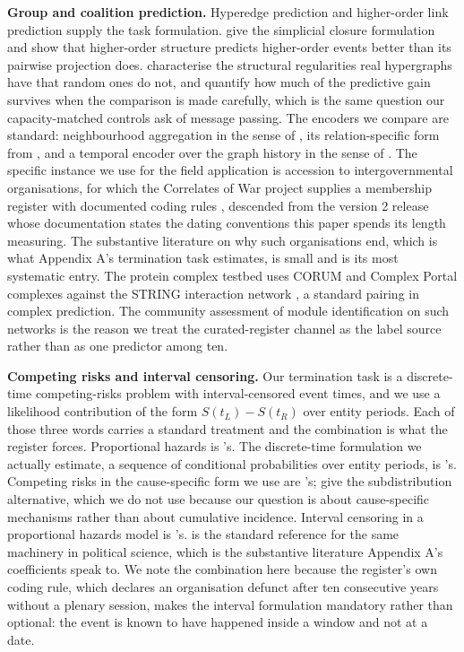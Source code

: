 \documentclass[twoside,11pt]{article}
\begin{document}
\textbf{Group and coalition prediction.} Hyperedge prediction and higher-order link prediction supply the task formulation. \citet{benson} give the simplicial closure formulation and show that higher-order structure predicts higher-order events better than its pairwise projection does. \citet{do_hyper} characterise the structural regularities real hypergraphs have that random ones do not, and \citet{yoon} quantify how much of the predictive gain survives when the comparison is made carefully, which is the same question our capacity-matched controls ask of message passing. The encoders we compare are standard: neighbourhood aggregation in the sense of \citet{hamilton}, its relation-specific form from \citet{rgcn}, and a temporal encoder over the graph history in the sense of \citet{tgn}. The specific instance we use for the field application is accession to intergovernmental organisations, for which the Correlates of War project supplies a membership register with documented coding rules \citep{cow_igo}, descended from the version 2 release \citep{cow_igo2} whose documentation states the dating conventions this paper spends its length measuring. The substantive literature on why such organisations end, which is what Appendix A's termination task estimates, is small and \citet{eilstrup} is its most systematic entry. The protein complex testbed uses CORUM \citep{corum} and Complex Portal \citep{complexportal} complexes against the STRING interaction network \citep{string}, a standard pairing in complex prediction. The community assessment of module identification on such networks \citep{choobdar} is the reason we treat the curated-register channel as the label source rather than as one predictor among ten.

\textbf{Competing risks and interval censoring.} Our termination task is a discrete-time competing-risks problem with interval-censored event times, and we use a likelihood contribution of the form \(S(t_{L}) - S(t_{R})\) over entity periods. Each of those three words carries a standard treatment and the combination is what the register forces. Proportional hazards is \citet{cox}'s. The discrete-time formulation we actually estimate, a sequence of conditional probabilities over entity periods, is \citet{allison}'s. Competing risks in the cause-specific form we use are \citet{prentice}'s; \citet{finegray} give the subdistribution alternative, which we do not use because our question is about cause-specific mechanisms rather than about cumulative incidence. Interval censoring in a proportional hazards model is \citet{finkelstein}'s. \citet{boxsteff} is the standard reference for the same machinery in political science, which is the substantive literature Appendix A's coefficients speak to. We note the combination here because the register's own coding rule, which declares an organisation defunct after ten consecutive years without a plenary session, makes the interval formulation mandatory rather than optional: the event is known to have happened inside a window and not at a date.
\end{document}

